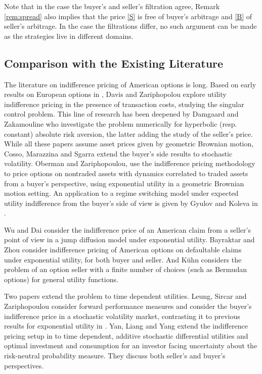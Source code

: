 \documentclass{article}
\begin{document}
Note that in the case the buyer's and seller's filtration agree, Remark \ref{rem:spread} also implies that the price \eqref{S} is free of buyer's arbitrage and \eqref{B} of seller's arbitrage. In the case the filtrations differ, no such argument can be made as the strategies live in different domains.



\subsection{Comparison with the Existing Literature}\label{sec:lit-comp}

The literature on indifference pricing of American options is long. Based on early results on European options in \cite{DPZ93}, Davis and Zariphopolou \cite{DZ95} explore utility indifference pricing in the presence of transaction costs, studying the singular control problem. This line of research has been deepened by Damgaard \cite{Dam06} and Zakamouline \cite{Zak05} who investigate the problem numerically for hyperbolic (resp. constant) absolute risk aversion, the latter adding the study of the seller's price. While all these papers assume asset prices given by geometric Brownian motion, Cosso, Marazzina and Sgarra \cite{CMS15} extend the buyer's side results to stochastic volatility. Oberman and Zariphopoulou, \cite {OZ03} use the indifference pricing methodology to price options on nontraded assets with dynamics correlated to traded assets from a buyer's perspective, using exponential utility in a geometric Brownian motion setting. An application to a regime switching model under expected utility indifference from the buyer's side of view is given by Gyulov and Koleva in \cite{GK22}.

Wu and Dai \cite{WD09} consider the indifference price of an American claim from a seller's point of view in a jump diffusion model under exponential utility. Bayraktar and Zhou \cite{BZ14} consider indifference pricing of American options on defaultable claims under exponential utility, for both buyer and seller. And K\"{u}hn \cite{Kue02} considers the problem of an option seller with a finite number of choices (such as Bermudan options) for general utility functions.

Two papers extend the problem to time dependent utilities. Leung, Sircar and Zariphopoulou \cite{LSZ12} consider forward performance measures and consider the buyer's indifference price in a stochastic volatility market, contrasting it to previous results for exponential utility in \cite{LS09}. Yan, Liang and Yang extend the indifference pricing setup in \cite{YLY15} to time dependent, additive stochastic differential utilities and optimal investment and consumption for an investor facing uncertainty about the risk-neutral probability measure. They discuss both seller's and buyer's perspectives.
\end{document}
